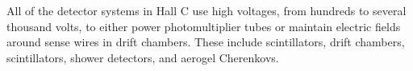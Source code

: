 All of the detector systems in Hall C use high voltages, from hundreds to
several thousand volts, to either power photomultiplier tubes or maintain
electric fields around sense wires in drift chambers.
These include scintillators, drift chambers,
scintillators, shower detectors, and aerogel Cherenkovs.

